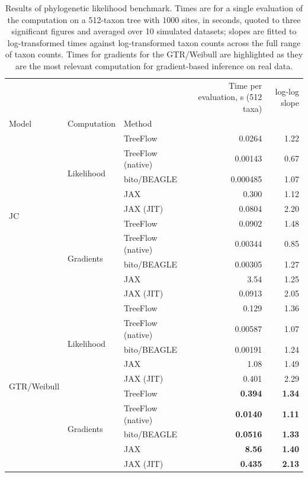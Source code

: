 \documentclass{article}
\begin{document}
\begin{table}
    \centering
    \begin{tabular}{lllrr}
\toprule
 &  &  & Time per evaluation, s (512 taxa) & log-log slope \\
Model & Computation & Method &  &  \\
\midrule
\multirow[t]{10}{*}{JC} & \multirow[t]{5}{*}{Likelihood} & TreeFlow & 0.0264 & 1.22 \\
 &  & TreeFlow (native) & 0.00143 & 0.67 \\
 &  & bito/BEAGLE & 0.000485 & 1.07 \\
 &  & JAX & 0.300 & 1.12 \\
 &  & JAX (JIT) & 0.0804 & 2.20 \\
 & \multirow[t]{5}{*}{Gradients} & TreeFlow & 0.0902 & 1.48 \\
 &  & TreeFlow (native) & 0.00344 & 0.85 \\
 &  & bito/BEAGLE & 0.00305 & 1.27 \\
 &  & JAX & 3.54 & 1.25 \\
 &  & JAX (JIT) & 0.0913 & 2.05 \\
\multirow[t]{10}{*}{GTR/Weibull} & \multirow[t]{5}{*}{Likelihood} & TreeFlow & 0.129 & 1.36 \\
 &  & TreeFlow (native) & 0.00587 & 1.07 \\
 &  & bito/BEAGLE & 0.00191 & 1.24 \\
 &  & JAX & 1.08 & 1.49 \\
 &  & JAX (JIT) & 0.401 & 2.29 \\
 & \multirow[t]{5}{*}{Gradients} & TreeFlow & \bfseries 0.394 & \bfseries 1.34 \\
 &  & TreeFlow (native) & \bfseries 0.0140 & \bfseries 1.11 \\
 &  & bito/BEAGLE & \bfseries 0.0516 & \bfseries 1.33 \\
 &  & JAX & \bfseries 8.56 & \bfseries 1.40 \\
 &  & JAX (JIT) & \bfseries 0.435 & \bfseries 2.13 \\
\bottomrule
\end{tabular}

    \caption{Results of phylogenetic likelihood benchmark. Times are for a single evaluation of the computation on a 512-taxon tree with 1000 sites, in seconds, quoted to three significant figures and averaged over 10 simulated datasets; slopes are fitted to log-transformed times against log-transformed taxon counts across the full range of taxon counts. Times for gradients for the GTR/Weibull are highlighted as they are the most relevant computation for gradient-based inference on real data.}
    \label{tab:benchmarkfit}
\end{table}
\end{document}
